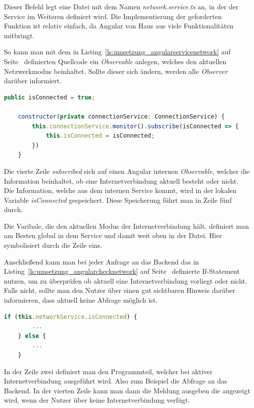 Dieser Befehl legt eine Datei mit dem Namen \textit{network.service.ts} an, in der der Service im Weiteren definiert
wird. Die Implementierung der geforderten Funktion ist relativ einfach, da Angular von Haus aus viele Funktionalitäten
mitbringt.

So kann man mit dem in Listing~\ref{ls:umsetzung_angularservicenetwork} auf
Seite~\pageref{ls:umsetzung_angularservicenetwork} definierten Quellcode ein \textit{Observable} anlegen, welches den
aktuellen Netzwerkmodus beinhaltet. Sollte dieser sich ändern, werden alle \textit{Observer} darüber informiert.

\begin{lstlisting}[language=JavaScript, caption=Funktion des Network-Services, label=ls:umsetzung_angularservicenetwork]
    public isConnected = true;

    constructor(private connectionService: ConnectionService) {
        this.connectionService.monitor().subscribe(isConnected => {
            this.isConnected = isConnected;
        })
    }
\end{lstlisting}

Die vierte Zeile \textit{subscribed} sich auf einen Angular internen \textit{Observable}, welcher die Information
beinhaltet, ob eine Internetverbindung aktuell besteht oder nicht. Die Information, welche aus dem internen Service
kommt, wird in der lokalen Variable \textit{isConnected} gespeichert. Diese Speicherung führt man in Zeile fünf durch.

Die Varibale, die den aktuellen Modus der Internetverbindung hält, definiert man am Besten global in dem Service und
damit weit oben in der Datei. Hier symbolisiert durch die Zeile eins.

Anschließend kann man bei jeder Anfrage an das Backend das in Listing~\ref{ls:umsetzung_angularchecknetwork} auf
Seite~\pageref{ls:umsetzung_angularchecknetwork} definierte If-Statement nutzen, um zu überprüfen ob aktuell eine
Internetverbindung vorliegt oder nicht. Falls nicht, sollte man den Nutzer über einen gut sichtbaren Hinweis darüber
informieren, dass aktuell keine Abfrage möglich ist.

\begin{lstlisting}[language=JavaScript, caption=Überprüfung ob eine Internetverbindung vorliegt, label=ls:umsetzung_angularchecknetwork]
    if (this.networkService.isConnected) {
        ...
    } else {
        ...
    }
\end{lstlisting}

In der Zeile zwei definiert man den Programmteil, welcher bei aktiver Internetverbindung ausgeführt wird. Also zum
Beispiel die Abfrage an das Backend. In der vierten Zeile kann man dann die Meldung ausgeben die angezeigt wird, wenn
der Nutzer über keine Internetverbindung verfügt.

